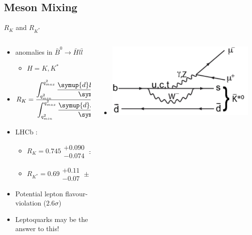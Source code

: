 \subsection{Meson Mixing}
\begin{frame}{$R_{K}$ and $R_{K^*}$}
    \begin{columns}
        \begin{column}{0.5\textwidth}
            \begin{itemize}
                \item anomalies in $\bar{B}^{0} \rightarrow \bar{H} l \bar{l}$ 
                \begin{itemize}
                    \item $H = K, K^*$
                \end{itemize} 
                \item <2, 3, 4> $R_{K} = \frac{ \displaystyle \int_{q^2_{min}}^{q^2_{max}} \frac{\symup{d}\mathcal{B} [ B \rightarrow H \mu^+ \mu^- ] } {\symup{d}q^2} } {\displaystyle \int_{q^2_{min}}^{q^2_{max}} \frac{\symup{d}\mathcal{B} [ B \rightarrow H e^+ e^- ] } {\symup{d}q^2}} \stackrel{!}{=} 1$ 
                \item <3, 4> LHCb \footnotemark:
                \begin{itemize}
                    \item <3, 4> $R_K = 0.745 \substack{+0.090 \\ -0.074} \pm 0.036$
                    \item <3, 4> $R_{K^*} = 0.69 \substack{+0.11 \\ -0.07} \pm 0.005$
                \end{itemize}
                \item <4> Potential lepton flavour-violation ($2.6 \sigma$)
                \item <4> Leptoquarks may be the answer to this!
            \end{itemize}
        \end{column}
        \begin{column}{0.5\textwidth}
            \begin{itemize}
                \item []\includegraphics[scale=0.25]{content/feynman/png/BtoK1.png}

\end{itemize}
\end{column}
\end{columns}
\end{frame}
